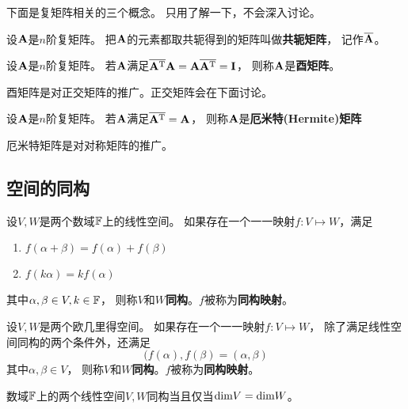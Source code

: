 下面是复矩阵相关的三个概念。
只用了解一下，不会深入讨论。

\begin{definition}[共轭矩阵]
  设$\mathbf{A}$是$n$阶复矩阵。
  把$\mathbf{A}$的元素都取共轭得到的矩阵叫做\textbf{共轭矩阵}，
  记作$\overline{\mathbf{A}}$。
\end{definition}

\begin{definition}[酉矩阵]
  设$\mathbf{A}$是$n$阶复矩阵。
  若$\mathbf{A}$满足$\overline{\mathbf{A}^{\textrm{T}}}\mathbf{A}=\mathbf{A}\overline{\mathbf{A}^{\textrm{T}}}=\mathbf{I}$，
  则称$\mathbf{A}$是\textbf{酉矩阵}。
\end{definition}

\begin{remark}
  酉矩阵是对正交矩阵的推广。正交矩阵会在下面讨论。
\end{remark}

\begin{definition}
  设$\mathbf{A}$是$n$阶复矩阵。
  若$\mathbf{A}$满足$\overline{\mathbf{A}^{\textrm{T}}}=\mathbf{A}$，
  则称$\mathbf{A}$是\textbf{厄米特(Hermite)矩阵}
\end{definition}

\begin{remark}
  厄米特矩阵是对对称矩阵的推广。
\end{remark}

\subsection{空间的同构}
\begin{definition}[线性空间的同构]
  设$V,W$是两个数域$\mathbb{F}$上的线性空间。
  如果存在一个一一映射$f:V\mapsto W$，满足
  \begin{enumerate}
    \item
    $f(\alpha+\beta)=f(\alpha)+f(\beta)$
    \item
    $f(k\alpha)=kf(\alpha)$
  \end{enumerate}
  其中$\alpha,\beta\in V,k\in\mathbb{F}$，
  则称$V$和$W$\textbf{同构}。$f$被称为\textbf{同构映射}。
\end{definition}

\begin{definition}[欧几里得空间的同构]
  设$V,W$是两个欧几里得空间。
  如果存在一个一一映射$f:V\mapsto W$，
  除了满足线性空间同构的两个条件外，还满足
  \[ (f(\alpha), f(\beta) = (\alpha, \beta) \]
  其中$\alpha,\beta\in V$，
  则称$V$和$W$\textbf{同构}。$f$被称为\textbf{同构映射}。
\end{definition}

\begin{theorem}[线性空间同构的充要条件]
  数域$\mathbb{F}$上的两个线性空间$V,W$同构当且仅当$\textrm{dim} V = \textrm{dim} W$。
\end{theorem}

